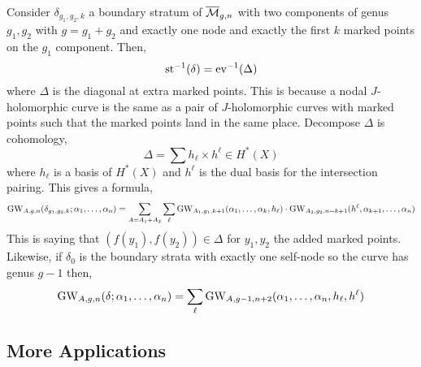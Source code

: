 \documentclass[12pt]{article}
\begin{document}
Consider $\delta_{g_1, g_2, k}$ a boundary stratum of $\overline{\mathcal{M}}_{g,n}$ with two components of genus $g_1, g_2$ with $g = g_1 + g_2$ and exactly one node and exactly the first $k$ marked points on the $g_1$ component. Then,
\[ \mathrm{st}^{-1}(\delta) = \mathrm{ev}^{-1}(\Delta) \]
where $\Delta$ is the diagonal at extra marked points. This is because a nodal $J$-holomorphic curve is the same as a pair of $J$-holomorphic curves with marked points such that the marked points land in the same place. Decompose $\Delta$ is cohomology,
\[ \Delta = \sum h_\ell \times h^\ell \in H^*(X) \]
where $h_\ell$ is a basis of $H^*(X)$ and $h^\ell$ is the dual basis for the intersection pairing. This gives a formula,
\[ \mathrm{GW}_{A,g,n}(\delta_{g_1, g_2, k} ; \alpha_1, \dots, \alpha_n) = \sum_{A = A_1 + A_2} \sum_\ell \mathrm{GW}_{A_1, g_1, k+1}(\alpha_1, \dots, \alpha_k, h_\ell) \cdot \mathrm{GW}_{A_2, g_2, n-k+1}(h^\ell, \alpha_{k+1}, \dots, \alpha_n) \]
This is saying that $(f(y_1), f(y_2)) \in \Delta$ for $y_1, y_2$ the added marked points. Likewise, if $\delta_0$ is the boundary strata with exactly one self-node so the curve has genus $g-1$ then,
\[ \mathrm{GW}_{A,g,n}(\delta; \alpha_1, \dots, \alpha_n) = \sum_{\ell} \mathrm{GW}_{A,g-1,n+2}(\alpha_1, \dots, \alpha_n, h_\ell, h^\ell) \]

\subsection{More Applications}
\end{document}
